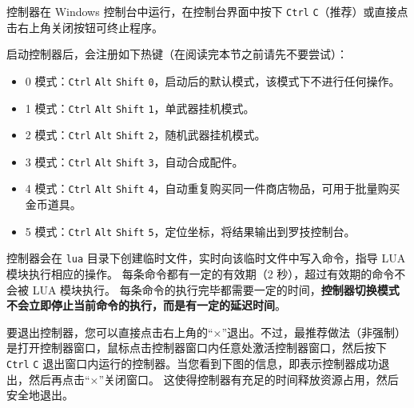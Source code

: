控制器在 Windows 控制台中运行，在控制台界面中按下 \lstinline{Ctrl} \lstinline{C}（推荐）或直接点击右上角关闭按钮可终止程序。

启动控制器后，会注册如下热键（在阅读完本节之前请先不要尝试）：

\begin{itemize}

    \item 0 模式：\lstinline{Ctrl} \lstinline{Alt} \lstinline{Shift} \lstinline{0}，启动后的默认模式，该模式下不进行任何操作。

    \item 1 模式：\lstinline{Ctrl} \lstinline{Alt} \lstinline{Shift} \lstinline{1}，单武器挂机模式。

    \item 2 模式：\lstinline{Ctrl} \lstinline{Alt} \lstinline{Shift} \lstinline{2}，随机武器挂机模式。

    \item 3 模式：\lstinline{Ctrl} \lstinline{Alt} \lstinline{Shift} \lstinline{3}，自动合成配件。

    \item 4 模式：\lstinline{Ctrl} \lstinline{Alt} \lstinline{Shift} \lstinline{4}，自动重复购买同一件商店物品，可用于批量购买金币道具。

    \item 5 模式：\lstinline{Ctrl} \lstinline{Alt} \lstinline{Shift} \lstinline{5}，定位坐标，将结果输出到罗技控制台。

\end{itemize}

控制器会在 \lstinline{lua} 目录下创建临时文件，实时向该临时文件中写入命令，指导 LUA 模块执行相应的操作。
每条命令都有一定的有效期（2 秒），超过有效期的命令不会被 LUA 模块执行。
每条命令的执行完毕都需要一定的时间，\textbf{\color{red}控制器切换模式不会立即停止当前命令的执行，而是有一定的延迟时间}。

要退出控制器，您可以直接点击右上角的“×”退出。不过，最推荐做法（非强制）是打开控制器窗口，鼠标点击控制器窗口内任意处激活控制器窗口，然后按下 \lstinline{Ctrl} \lstinline{C} 退出窗口内运行的控制器。当您看到下图的信息，即表示控制器成功退出，然后再点击“×”关闭窗口。
这使得控制器有充足的时间释放资源占用，然后安全地退出。


